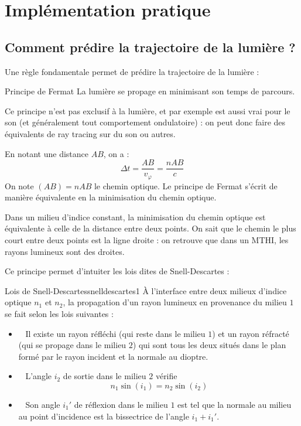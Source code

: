 \documentclass{classe}
\begin{document}
\section{Implémentation pratique}
\subsection{Comment prédire la trajectoire de la lumière ?}
Une règle fondamentale permet de prédire la trajectoire de la lumière :
\begin{théorème}{Principe de Fermat}{}
La lumière se propage en minimisant son temps de parcours.
\end{théorème}
\begin{remarque}{}{}
Ce principe n'est pas exclusif à la lumière, et par exemple est aussi vrai pour le son (et généralement tout comportement ondulatoire) : on peut donc faire des équivalents de ray tracing sur du son ou autres.
\end{remarque}{}{}
En notant une distance $AB$, on a :
\begin{equation*}
	\Delta t = \frac{AB}{v_\varphi} = \frac{nAB}{c}
\end{equation*}
On note $(AB) = nAB$ le chemin optique. Le principe de Fermat s'écrit de manière équivalente en la minimisation du chemin optique.\\
\begin{remarque}{}{}
	Dans un milieu d'indice constant, la minimisation du chemin optique est équivalente à celle de la distance entre deux points. On sait que le chemin le plus court entre deux points est la ligne droite : on retrouve que dans un MTHI, les rayons lumineux sont des droites.
\end{remarque}
Ce principe permet d'intuiter les lois dites de Snell-Descartes :
\begin{théorème}{Lois de Snell-Descartes}{snelldescartes1}
À l'interface entre deux milieux d'indice optique $n_1$ et $n_2$, la propagation d'un rayon lumineux en provenance du milieu $1$ se fait selon les lois suivantes :
\begin{itemize}
	\item\color{vulm}{Plan d'incidence :}\ \color{black} Il existe un rayon réfléchi (qui reste dans le milieu $1$) et un rayon réfracté (qui se propage dans le milieu $2$) qui sont tous les deux situés dans le plan formé par le rayon incident et la normale au dioptre.
	\item \color{vulm}{Réfraction :}\ \color{black} L'angle $i_{2}$ de sortie dans le milieu $2$ vérifie \[n_{1}\sin{\left(i_{1}\right)} = n_{2}\sin{\left(i_{2}\right)}\]
    \item \color{vulm}{Réflexion :}\ \color{black} Son angle $i_{1}'$ de réflexion dans le milieu $1$ est tel que la normale au milieu au point d'incidence est la bissectrice de l'angle $i_{1} + i_{1}'$.
\end{itemize}
\end{théorème}
\end{document}
